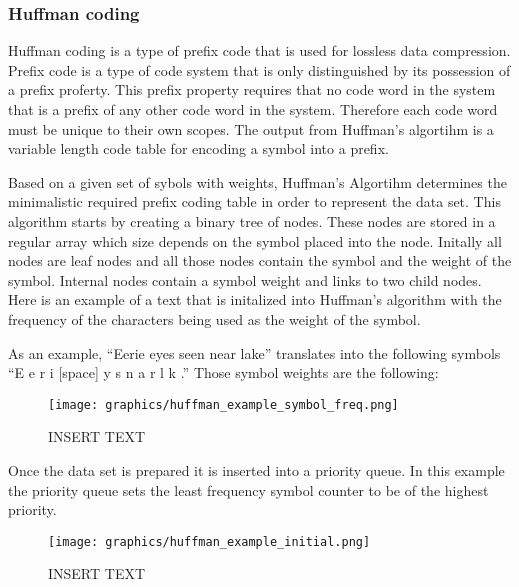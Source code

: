 \documentclass[letterpaper, 12pt]{article}
\begin{document}
\subsubsection{Huffman coding}
Huffman coding is a type of prefix code that is used for lossless data compression. Prefix code is a type
of code system that is only distinguished by its possession of a prefix proferty. This prefix property requires
that no code word in the system that is a prefix of any other code word in the system. Therefore each code word
must be unique to their own scopes. The output from Huffman's algortihm is a variable length code table for encoding
a symbol into a prefix.
\par\vspace{\baselineskip}
Based on a given set of sybols with weights, Huffman's Algortihm determines the minimalistic required prefix coding
table in order to represent the data set. This algorithm starts by creating a binary tree of nodes. These nodes
are stored in a regular array which size depends on the symbol placed into the node. Initally all nodes are leaf
nodes and all those nodes contain the symbol and the weight of the symbol. Internal nodes contain a symbol weight
and links to two child nodes. Here is an example of a text that is initalized into Huffman's algorithm with the
frequency of the characters being used as the weight of the symbol.
\par\vspace{\baselineskip}
As an example, ``Eerie eyes seen near lake'' translates into the following symbols ``E e r i [space] y s n a r l k .''
Those symbol weights are the following:
\par\vspace{\baselineskip}

\begin{figure}
  \centering
  \texttt{[image: graphics/huffman\_example\_symbol\_freq.png]}
  \caption{INSERT TEXT}
\end{figure}

Once the data set is prepared it is inserted into a priority queue. In this example the priority 
queue sets the least frequency symbol counter to be of the highest priority.
\par\vspace{\baselineskip}

\begin{figure}
  \centering
  \texttt{[image: graphics/huffman\_example\_initial.png]}
  \caption{INSERT TEXT}
\end{figure}
\end{document}
